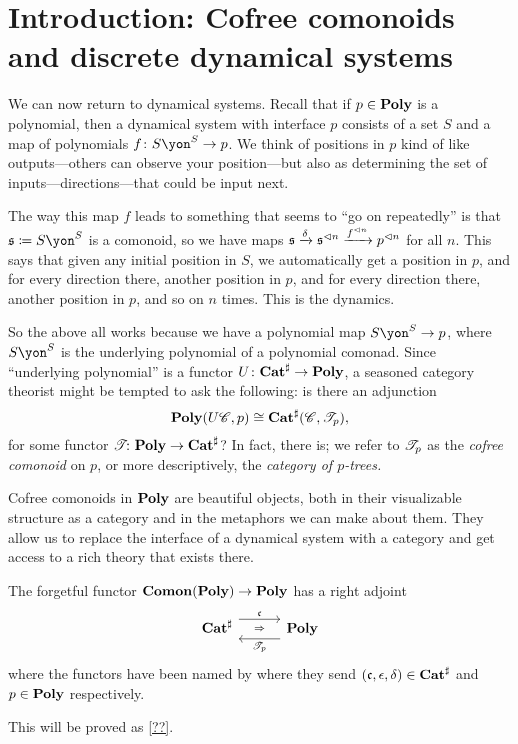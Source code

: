 \documentclass[Book-Poly]{subfiles}
\begin{document}
\section{Introduction: Cofree comonoids and discrete dynamical systems}

We can now return to dynamical systems. Recall that if $p\in\mathbf{Poly}$ is a polynomial, then a dynamical system with interface $p$ consists of a set $S$ and a map of polynomials $f\colon S\yon^S\to p$. We think of positions in $p$ kind of like outputs---others can observe your position---but also as determining the set of inputs---directions---that could be input next.

The way this map $f$ leads to something that seems to ``go on repeatedly'' is that $\ema{s}\coloneqq S\yon^S$ is a comonoid, so we have maps $\mathfrak{s}\xrightarrow{\delta}\mathfrak{s}^{\lhd n}\xrightarrow{f^{\lhd n}}p^{\lhd n}$ for all $n$. This says that given any initial position in $S$, we automatically get a position in $p$, and for every direction there, another position in $p$, and for every direction there, another position in $p$, and so on $n$ times. This is the dynamics.

So the above all works because we have a polynomial map $S\yon^S\to p$, where $S\yon^S$ is the underlying polynomial of a polynomial comonad. Since ``underlying polynomial'' is a functor $U\colon\mathbf{Cat}^\sharp\to\mathbf{Poly}$, a seasoned category theorist might be tempted to ask the following: is there an adjunction
\[
\mathbf{Poly}(U\mathscr{C},p)\cong\mathbf{Cat}^\sharp(\mathscr{C},\mathscr{T}_{p}),
\]
for some functor $\mathscr{T}_{}\colon\mathbf{Poly}\to\mathbf{Cat}^\sharp$? In fact, there is; we refer to $\mathscr{T}_{p}$ as the \emph{cofree comonoid} on $p$, or more descriptively, the \emph{category of $p$-trees.}

Cofree comonoids in $\mathbf{Poly}$ are beautiful objects, both in their visualizable structure as a category and in the metaphors we can make about them. They allow us to replace the interface of a dynamical system with a category and get access to a rich theory that exists there.

\begin{theorem}\label{thm.cofree}
The forgetful functor $\mathbf{Comon}(\mathbf{Poly})\to\mathbf{Poly}$ has a right adjoint
\[
  \adj{\smcat^\sharp}{\ema{c}}{\cofree{p}}{\poly}
\]
where the functors have been named by where they send $(\mathfrak{c},\epsilon,\delta)\in\mathbf{Cat}^\sharp$ and $p\in\mathbf{Poly}$ respectively.
\end{theorem}
This will be proved as \cref{??}.
\end{document}

